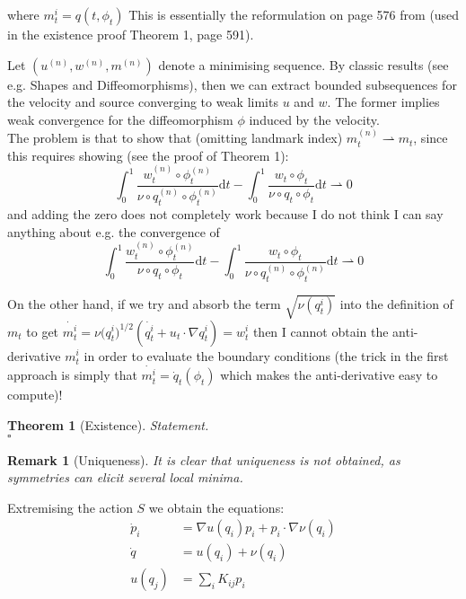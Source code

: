 \documentclass{article}
\newtheorem{theorem}{Theorem}
\newtheorem{remark}{Remark}
\newcommand{\diff}[1]{\text{d} #1}
\begin{document}
where $m^i_t = q(t, \phi_t)$ This is essentially the reformulation on page 576
from \cite{richardson2016metamorphosis} (used in the existence proof Theorem 1,
page 591). 

Let $(u^{(n)}, w^{(n)}, m^{(n)})$ denote a minimising sequence. By classic
results (see e.g.  Shapes and Diffeomorphisms), then we can extract bounded
subsequences for the velocity and source converging to weak limits $u$ and $w$.
The former implies weak convergence for the diffeomorphism $\phi$ induced by the
velocity.\\

The problem is that to show that (omitting landmark index) $m^{(n)}_t
\rightharpoonup m_t$, since this requires showing (see the proof of Theorem 1):
\[
\int_0^1\frac{w_t^{(n)}\circ\phi_t^{(n)}}{\nu\circ q_t^{(n)}\circ\phi_t^{(n)}}
\diff{t} -
\int_0^1\frac{w_t\circ\phi_t}{\nu\circ q_t\circ\phi_t} \diff{t}\rightharpoonup 0
\]
and adding the zero does not completely work because I do not think I can say
anything about e.g. the convergence of
\[
\int_0^1\frac{w_t^{(n)}\circ\phi_t^{(n)}}{\nu\circ q_t\circ\phi_t}
\diff{t} -
\int_0^1\frac{w_t\circ\phi_t}{\nu\circ q_t^{(n)}\circ\phi_t^{(n)}} \diff{t}\rightharpoonup 0
\]

On the other hand, if we try and absorb the term $\sqrt{\nu(q_t^i)}$ into the
definition of $m_t$ to get $\dot{m^i_t} = {\nu(q_t^i})^{1/2}(\dot{q^i_t} + u_t
\cdot \nabla q^i_t) = w^i_t$ then I cannot obtain the anti-derivative $m^i_t$ in
order to evaluate the boundary conditions (the trick in the first approach is
simply that $\dot{m^i_t} = \dot q_t(\phi_t)$ which makes the anti-derivative
easy to compute)!



\begin{theorem}[Existence]
Statement.\\

{\hfill $\square$}
\end{theorem}

\begin{remark}[Uniqueness]
It is clear that uniqueness is not obtained, as symmetries can elicit several
local minima.
\end{remark}

Extremising the action $S$ we obtain the equations: 
\begin{align}
\dot p_i & = \nabla u(q_i)p_i  + p_i \cdot \nabla \nu(q_i)\\
\dot q & = u(q_i) + \nu(q_i)\\
u(q_j) & = \sum_i K_{ij} p_i
\end{align}
\end{document}
